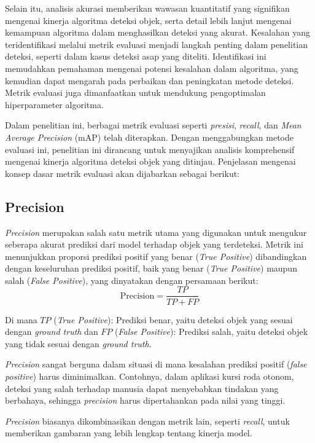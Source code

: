 Selain itu, analisis akurasi memberikan wawasan kuantitatif yang signifikan mengenai kinerja algoritma deteksi objek, serta detail lebih lanjut mengenai kemampuan algoritma dalam menghasilkan deteksi yang akurat. Kesalahan yang teridentifikasi melalui metrik evaluasi menjadi langkah penting dalam penelitian deteksi, seperti dalam kasus deteksi asap yang diteliti. Identifikasi ini memudahkan pemahaman mengenai potensi kesalahan dalam algoritma, yang kemudian dapat mengarah pada perbaikan dan peningkatan metode deteksi. Metrik evaluasi juga dimanfaatkan untuk mendukung pengoptimalan hiperparameter algoritma.

Dalam penelitian ini, berbagai metrik evaluasi seperti \emph{presisi}, \emph{recall}, dan \emph{Mean Average Precision} (mAP) telah diterapkan. Dengan menggabungkan metode evaluasi ini, penelitian ini dirancang untuk menyajikan analisis komprehensif mengenai kinerja algoritma deteksi objek yang ditinjau. Penjelasan mengenai konsep dasar metrik evaluasi akan dijabarkan sebagai berikut:

\subsection{Precision}
\label{subsec:precision}

\emph{Precision} merupakan salah satu metrik utama yang digunakan untuk mengukur seberapa akurat prediksi dari model terhadap objek yang terdeteksi. Metrik ini menunjukkan proporsi prediksi positif yang benar (\emph{True Positive}) dibandingkan dengan keseluruhan prediksi positif, baik yang benar (\emph{True Positive}) maupun salah (\emph{False Positive}), yang dinyatakan dengan persamaan berikut: 
\begin{equation} 
  \mathrm{Precision} = \frac{TP}{TP + FP} 
\end{equation}

Di mana \(TP\) (\emph{True Positive}): Prediksi benar, yaitu deteksi objek yang sesuai dengan \emph{ground truth} dan \(FP\) (\emph{False Positive}): Prediksi salah, yaitu deteksi objek yang tidak sesuai dengan \emph{ground truth}.

\emph{Precision} sangat berguna dalam situasi di mana kesalahan prediksi positif (\emph{false positive}) harus diminimalkan. Contohnya, dalam aplikasi kursi roda otonom, deteksi yang salah terhadap manusia dapat menyebabkan tindakan yang berbahaya, sehingga \emph{precision} harus dipertahankan pada nilai yang tinggi.

\emph{Precision} biasanya dikombinasikan dengan metrik lain, seperti \emph{recall}, untuk memberikan gambaran yang lebih lengkap tentang kinerja model.

